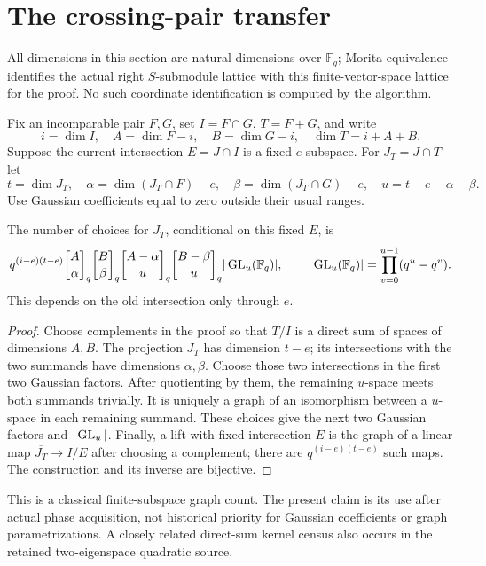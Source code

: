 \documentclass[11pt]{article}
\newcommand{\F}{\mathbb F}\newcommand{\rank}{\operatorname{rank}}
\newcommand{\gb}[2]{{#1\brack #2}_q}
\begin{document}
\section{The crossing-pair transfer}
All dimensions in this section are natural dimensions over $\F_q$; Morita
equivalence identifies the actual right $S$-submodule lattice with this
finite-vector-space lattice for the proof. No such coordinate identification
is computed by the algorithm.

Fix an incomparable pair $F,G$, set $I=F\cap G$, $T=F+G$, and write
\[
 i=\dim I,\quad A=\dim F-i,\quad B=\dim G-i,
 \quad\dim T=i+A+B.
\]
Suppose the current intersection $E=J\cap I$ is a fixed $e$-subspace. For
$J_T=J\cap T$ let
\[
 t=\dim J_T,\quad
 \alpha=\dim(J_T\cap F)-e,\quad
 \beta=\dim(J_T\cap G)-e,\quad
 u=t-e-\alpha-\beta.
\]
Use Gaussian coefficients equal to zero outside their usual ranges.

\begin{lemma}\label{lem:transfer}
The number of choices for $J_T$, conditional on this fixed $E$, is
\begin{equation}\label{eq:transfer}
 q^{(i-e)(t-e)}
 \gb{A}{\alpha}\gb{B}{\beta}
 \gb{A-\alpha}{u}\gb{B-\beta}{u}
 |\GL_u(\F_q)|,
 \qquad |\GL_u(\F_q)|=\prod_{v=0}^{u-1}(q^u-q^v).
\end{equation}
This depends on the old intersection only through $e$.
\end{lemma}
\begin{proof}
Choose complements in the proof so that $T/I$ is a direct sum of spaces of
dimensions $A,B$. The projection $\overline{J_T}$ has dimension $t-e$;
its intersections with the two summands have dimensions $\alpha,\beta$.
Choose those two intersections in the first two Gaussian factors. After
quotienting by them, the remaining $u$-space meets both summands trivially.
It is uniquely a graph of an isomorphism between a $u$-space in each
remaining summand. These choices give the next two Gaussian factors and
$|\operatorname{GL}_u|$. Finally, a lift with fixed intersection $E$ is the graph of a
linear map $\overline{J_T}\to I/E$ after choosing a complement; there are
$q^{(i-e)(t-e)}$ such maps. The construction and its inverse are bijective.
\end{proof}
This is a classical finite-subspace graph count. The present claim is its
use after actual phase acquisition, not historical priority for Gaussian
coefficients or graph parametrizations. A closely related direct-sum
kernel census also occurs in the retained two-eigenspace quadratic source.
\end{document}
